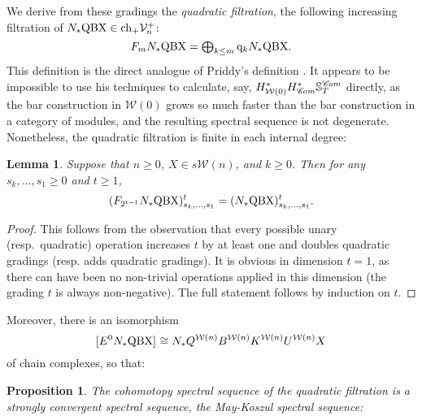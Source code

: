 \documentclass[11pt]{amsart} \renewcommand{\baselinestretch}{1.2}
\theoremstyle{plain}
\newtheorem{lem}[thm]{Lemma}
\newtheorem{prop}[thm]{Proposition}
\numberwithin{equation}{section} %
\theoremstyle{plain}
\newtheorem{lem}[thm]{Lemma}
\newtheorem{prop}[thm]{Proposition}
\numberwithin{equation}{chapter} %
\newcommand{\scrC}{\mathscr{C}}
\newcommand{\calV}{\mathcal{V}}
\newcommand{\calw}{\mathcal{W}}
\newcommand{\vect}[2]{\calV^{#1}_{#2}}
\newcommand{\quadgrad}[1]{\mathrm{q}_{#1}}
\newcommand{\complexes}{\mathrm{ch}_+}
\newcommand{\algs}{{\scrC\!\textit{\normalfont\textit{om}}}}
\newcommand{\E}[5]{[E^{#1}_{#2}#3]^{#4}_{#5}}
\begin{document}
\begin{May sseq and vanishing line}
We derive from these gradings the \emph{quadratic filtration}, the following increasing filtration of $N_*\textup{QBX}\in \complexes \vect{+}{n}$:
\[F_mN_*\textup{QBX}=\textstyle\bigoplus_{k\leq m} \quadgrad{k}N_*\textup{QBX}. \]
This definition is the direct analogue of Priddy's definition \cite{PriddyKoszul.pdf}. It appears to be impossible to use his techniques to calculate, say, $H^*_{\calw(0)}H^*_\algs\mathbb{S}^{\algs}_T$ directly, as the bar construction in $\calw(0)$ grows so much faster than the bar construction in a category of modules, and the resulting spectral sequence is not degenerate. Nonetheless, the quadratic filtration is finite in each internal degree:
\begin{lem}
Suppose that $n\geq0$, $X\in s\calw(n)$, and $k\geq0$. Then for any $s_k,\ldots,s_1\geq0$ and $t\geq1$,
\[(F_{2^{t-1}}N_*\textup{QBX})_{{s_k,\ldots,s_1}}^t=(N_*\textup{QBX})_{{s_k,\ldots,s_1}}^t.\]
\end{lem}
\begin{proof}
This follows from the observation that every possible unary (resp.\ quadratic) operation increases $t$ by at least one and doubles quadratic gradings (resp. adds quadratic gradings). It is obvious in dimension $t=1$, as there can have been no non-trivial operations applied in this dimension (the grading $t$ is always non-negative). The full statement follows by induction on $t$.
%
%
\end{proof}
Moreover, there is an isomorphism
\[\E{0}{}{N_*\textup{QBX}}{}{}\cong N_*Q^{\calw(n)}B^{\calw(n)}K^{\calw(n)}U^{\calw(n)}X\]
of chain complexes, so that:
\begin{prop}
\label{theMaySseq}
The cohomotopy spectral sequence of the quadratic filtration is a strongly convergent spectral sequence, the \emph{May-Koszul} spectral sequence:

\end{prop}
\end{May sseq and vanishing line}
\end{document}
